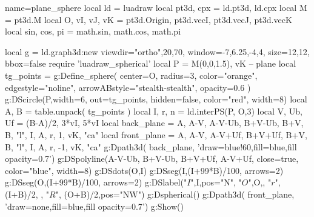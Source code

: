 \documentclass[border=5pt]{standalone}%
\begin{document}
\begin{luadraw}{name=plane_sphere}
local ld = luadraw
local pt3d, cpx = ld.pt3d, ld.cpx
local M = pt3d.M
local O, vI, vJ, vK = pt3d.Origin, pt3d.vecI, pt3d.vecJ, pt3d.vecK
local sin, cos, pi = math.sin, math.cos, math.pi

local g = ld.graph3d:new{ viewdir={"ortho",20,70}, window={-7,6.25,-4,4}, 
    size={12,12}, bbox=false }
require 'luadraw_spherical'
local P = {M(0,0,1.5), vK} -- plane
local tg_points = {}
g:Define_sphere( {center=O, radius=3, color="orange", edgestyle="noline", 
    arrowABstyle="stealth-stealth", opacity=0.6} )
g:DScircle(P,{width=6, out=tg_points, hidden=false, color="red", width=8})
local A, B = table.unpack( tg_points )
local I, r, n = ld.interPS(P, {O,3})
local V, Ub, Uf = (B-A)/2, 3*vI, 5*vI
local back_plane = {A, A-V, A-V-Ub, B+V-Ub, B+V, B, "l", I, A, r, 1, vK, "ca"}
local front_plane = {A, A-V, A-V+Uf, B+V+Uf, B+V, B, "l", I, A, r, -1, vK, "ca"}
g:Dpath3d( back_plane, 'draw=blue!60,fill=blue,fill opacity=0.7')
g:DSpolyline({A-V-Ub, B+V-Ub, B+V+Uf, A-V+Uf}, {close=true, color="blue", width=8})
g:DSdots({O,I})
g:DSseg({I,(I+99*B)/100}, {arrows=2})
g:DSseg({O,(I+99*B)/100}, {arrows=2})
g:DSlabel("$I$",I,{pos="N"}, "$O$",O,{}, "$r$", (I+B)/2, {}, 
"$R$", (O+B)/2,{pos="NW"})
g:Dspherical()
g:Dpath3d( front_plane, 'draw=none,fill=blue,fill opacity=0.7')
g:Show()
\end{luadraw}
\end{document}
